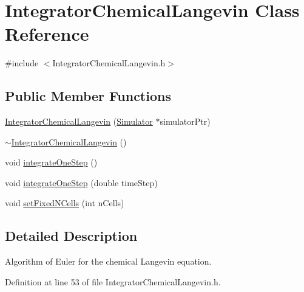 \hypertarget{class_integrator_chemical_langevin}{\section{\-Integrator\-Chemical\-Langevin \-Class \-Reference}
\label{class_integrator_chemical_langevin}
}


{\ttfamily \#include $<$\-Integrator\-Chemical\-Langevin.\-h$>$}

\subsection*{\-Public \-Member \-Functions}
\begin{DoxyCompactItemize}
\item 
\hyperlink{class_integrator_chemical_langevin_ab71a74a8bc87d8ae7a12b75d00b8010e}{\-Integrator\-Chemical\-Langevin} (\hyperlink{class_simulator}{\-Simulator} $\ast$simulator\-Ptr)
\item 
\hyperlink{class_integrator_chemical_langevin_ad3da14ad4ab5d2cc6d7498839d977a26}{$\sim$\-Integrator\-Chemical\-Langevin} ()
\item 
void \hyperlink{class_integrator_chemical_langevin_ac7c751bb531f9923149d38316a7d48fd}{integrate\-One\-Step} ()
\item 
void \hyperlink{class_integrator_chemical_langevin_a453c4de6202e63b107cc093566bcfe73}{integrate\-One\-Step} (double time\-Step)
\item 
void \hyperlink{class_integrator_chemical_langevin_a8d780c68e33d062628b848236cf52a59}{set\-Fixed\-N\-Cells} (int n\-Cells)
\end{DoxyCompactItemize}


\subsection{\-Detailed \-Description}
\-Algorithm of \-Euler for the chemical \-Langevin equation. 

\-Definition at line 53 of file \-Integrator\-Chemical\-Langevin.\-h.



